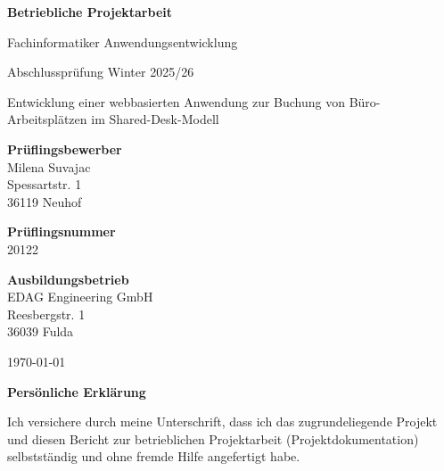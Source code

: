 \documentclass[11pt,a4paper]{report}
\begin{document}
\pagestyle{empty}

\begin{titlepage}
    \centering
    \vspace*{2cm}
    {\Huge\bfseries Betriebliche Projektarbeit \\[0.5cm]}
    
    {\large Fachinformatiker Anwendungsentwicklung \\[0.5cm]}
    
    {\large Abschlussprüfung Winter 2025/26  \\[0.5cm]}
    
    {\LARGE Entwicklung einer webbasierten Anwendung zur Buchung von Büro-Arbeitsplätzen im Shared-Desk-Modell \\[1cm]}
    
	{\large\bfseries Prüflingsbewerber \\[0.3cm]}
	{\normalsize Milena Suvajac \\}
	{\normalsize Spessartstr. 1 \\}
	{\normalsize 36119 Neuhof \\[1cm]}

	{\large\bfseries Prüflingsnummer \\[0.3cm]}
	{\normalsize 20122 \\[1cm]}

	{\large\bfseries Ausbildungsbetrieb \\[0.3cm]}
	{\normalsize EDAG Engineering GmbH \\}
	{\normalsize Reesbergstr. 1 \\}
	{\normalsize 36039 Fulda \\}
    
    \vfill
    {\large \today}
\end{titlepage}


\clearpage
\thispagestyle{empty}  %

\vspace*{1cm}

{\Large\bfseries Persönliche Erklärung}

\vspace{1cm}

Ich versichere durch meine Unterschrift, dass ich das zugrundeliegende Projekt und diesen Bericht zur betrieblichen Projektarbeit (Projektdokumentation) selbstständig und ohne fremde Hilfe angefertigt habe.

\vspace{0.5cm}
\end{document}

